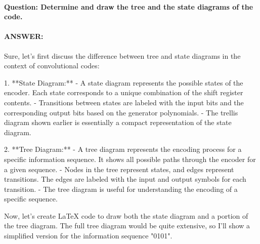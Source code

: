 \documentclass[colorlinks,11pt,a4paper,normalphoto,withhyper,ragged2e]{altareport}
\begin{document}
				
				
				
				
				
				\paragraph{Question: Determine and draw the tree and the state diagrams of the code.}
				\paragraph{ANSWER:}
				
				Sure, let's first discuss the difference between tree and state diagrams in the context of convolutional codes:
				
				1. **State Diagram:**
				- A state diagram represents the possible states of the encoder. Each state corresponds to a unique combination of the shift register contents.
				- Transitions between states are labeled with the input bits and the corresponding output bits based on the generator polynomials.
				- The trellis diagram shown earlier is essentially a compact representation of the state diagram.
				
				2. **Tree Diagram:**
				- A tree diagram represents the encoding process for a specific information sequence. It shows all possible paths through the encoder for a given sequence.
				- Nodes in the tree represent states, and edges represent transitions. The edges are labeled with the input and output symbols for each transition.
				- The tree diagram is useful for understanding the encoding of a specific sequence.
				
				Now, let's create LaTeX code to draw both the state diagram and a portion of the tree diagram. The full tree diagram would be quite extensive, so I'll show a simplified version for the information sequence "0101".
				
\end{document}
